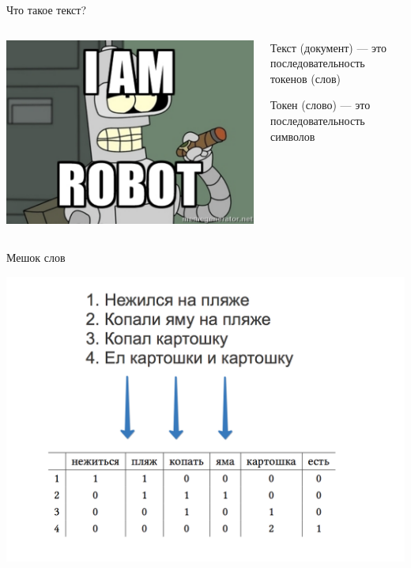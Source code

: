 \documentclass[notes,12pt, aspectratio=169]{beamer}
\newenvironment{wideitemize}{\itemize\addtolength{\itemsep}{10pt}}{\enditemize}
\begin{document}
\begin{frame}{Что такое текст?}
\begin{columns}
\begin{column}{.48\linewidth}
	\includegraphics[scale=0.3]{bender.png}
\end{column}

	\begin{column}{.48\linewidth}
\begin{wideitemize} 
	\item  Текст (документ) —  это последовательность токенов (слов)
	\item  Токен (слово) —  это последовательность символов
\end{wideitemize}
	\end{column}	
\end{columns}
\end{frame} 


\begin{frame}{Мешок слов}
\begin{center}
	\includegraphics[width=.7\linewidth]{text.png}
\end{center}
\end{frame} 
\end{document}
